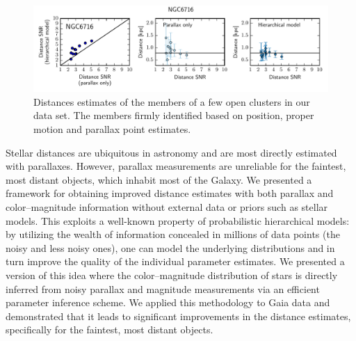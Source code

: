 \documentclass[manuscript, letterpaper]{aastex6}
\makeatletter
\let\origsection\section
\renewcommand\section{\@ifstar{\starsection}{\nostarsection}}
\newcommand\nostarsection[1]{\sectionprelude\origsection{#1}}
\newcommand\starsection[1]{\sectionprelude\origsection*{#1}}
\newcommand\sectionprelude{\vspace{1em}}
\makeatother
\begin{document}
\begin{figure}
\hspace*{-3mm}\includegraphics[width=15.8cm, trim = 0cm 0cm 0cm 0.65cm, clip]{NGC6716_metrics}
\caption{Distances estimates of the members of a few open clusters in our data set. The members firmly identified based on position, proper motion and parallax point estimates. }
\label{fig:oc_metrics}
\end{figure}


\section{Conclusion}\label{sec:concl}

Stellar distances are ubiquitous in astronomy and are most directly estimated with parallaxes. 
However, parallax measurements are unreliable for the faintest, most distant objects, which inhabit most of the Galaxy. 
We presented a framework for obtaining improved distance estimates with both parallax and color--magnitude information without external data or priors such as stellar models. 
This exploits a well-known property of probabilistic hierarchical models: by utilizing the wealth of information concealed in millions of data points (the noisy and less noisy ones), one can model the underlying distributions and in turn improve the quality of the individual parameter estimates. 
We presented a version of this idea where the color--magnitude distribution of stars is directly inferred from noisy parallax and magnitude measurements via an efficient parameter inference scheme.
We applied this methodology to Gaia data and demonstrated that it leads to significant improvements in the distance estimates, specifically for the faintest, most distant objects.
\end{document}

